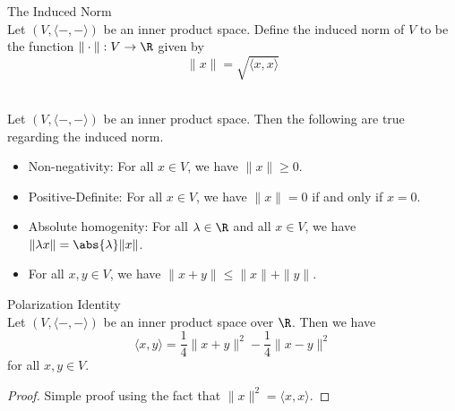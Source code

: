 \documentclass[a4paper]{article}
\begin{document}
\begin{defn}{The Induced Norm}{}\\
Let $(V,\langle-,-\rangle)$ be an inner product space. Define the induced norm of $V$ to be the function $\|\cdot\|:V\to\R$ given by $$\|x\|=\sqrt{\langle x,x\rangle}$$
\end{defn}

\begin{prp}{}{}\\
Let $(V,\langle-,-\rangle)$ be an inner product space. Then the following are true regarding the induced norm. 
\begin{itemize}
\item Non-negativity: For all $x\in V$, we have $\|x\|\geq 0$. 
\item Positive-Definite: For all $x\in V$, we have $\|x\|=0$ if and only if $x=0$. 
\item Absolute homogenity: For all $\lambda\in\R$ and all $x\in V$, we have $\|\lambda x\|=\abs{\lambda}\|x\|$. 
\item For all $x,y\in V$, we have $\|x+y\|\leq\|x\|+\|y\|$. 
\end{itemize}
\end{prp}

\begin{lmm}{Polarization Identity}{}\\
Let $(V,\langle-,-\rangle)$ be an inner product space over $\R$. Then we have $$\langle x,y\rangle=\frac{1}{4}\|x+y\|^2-\frac{1}{4}\|x-y\|^2$$ for all $x,y\in V$. 
\begin{proof} Simple proof using the fact that $\|x\|^2=\langle x,x\rangle$. 
\end{proof}
\end{lmm}
\end{document}
